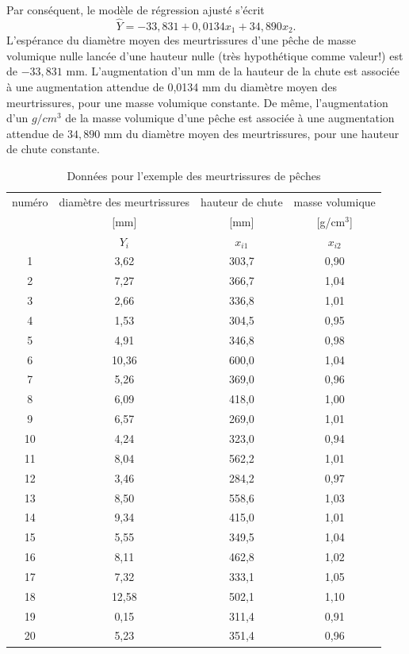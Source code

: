 Par conséquent, le modèle de régression ajusté s'écrit 
$$\hat Y=-33,831+0,0134x_1+34,890x_2.$$
L'espérance du diamètre moyen des meurtrissures d'une pêche de masse volumique nulle lancée d'une hauteur nulle (très hypothétique comme valeur!) est de $-33,831$ mm. L'augmentation d'un mm de la hauteur de la chute est associée à une augmentation attendue de 0,0134 mm du diamètre moyen des meurtrissures, pour une masse volumique constante. De même, l'augmentation d'un $g/cm^3$ de la masse volumique d'une pêche est associée à une augmentation attendue de $34,890$ mm du diamètre moyen des meurtrissures, pour une hauteur de chute constante.


\begin{table}[htb!]
\caption{Données pour l'exemple des meurtrissures de pêches}
\label{exp_data}
\begin{tabular}{|c|c|c|c|} \hline
numéro &  diamètre des meurtrissures  & hauteur de chute  & masse volumique  \\
 & [mm] & [mm] & [g/cm$^3$] \\
        & $Y_i$        & $x_{i1}$      &  $x_{i2}$ \\ \hline
 1   &   3,62  &   303,7  & 0,90      \\
 2   &   7,27  &   366,7  & 1,04     \\
 3   &   2,66  &  336,8   & 1,01     \\
 4   &   1,53  &  304,5   & 0,95      \\
 5   &   4,91  &  346,8   & 0,98      \\
 6   &   10,36 &   600,0    & 1,04       \\
 7   &   5,26  &   369,0    & 0,96       \\
 8   &   6,09  &   418,0    & 1,00           \\
 9   &   6,57  &   269,0    & 1,01        \\
 10  &   4,24  &   323,0    & 0,94         \\
 11  &   8,04  &   562,2  & 1,01          \\
 12  &   3,46  &   284,2  & 0,97           \\
 13  &   8,50   &   558,6  & 1,03           \\
 14  &   9,34  &   415,0    & 1,01            \\
 15  &   5,55  &   349,5  & 1,04            \\
 16  &   8,11  &   462,8  & 1,02            \\
 17  &   7,32  &   333,1  & 1,05            \\
 18  &   12,58 &   502,1  & 1,10            \\
 19  &   0,15  &   311,4  & 0,91            \\
 20  &   5,23  &   351,4  & 0,96            \\   \hline
\end{tabular}

\end{table}

